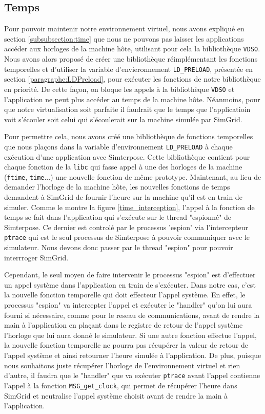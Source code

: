 \subsection{Temps}
\label{section:work:time}

Pour pouvoir maintenir notre environnement virtuel, nous avons expliqué en section \ref{subsubsection:time} que nous ne pouvons pas laisser les applications accéder aux horloges de la machine hôte, utilisant pour cela la bibliothèque \texttt{VDSO}. Nous avons alors proposé de créer une bibliothèque réimplémentant les fonctions temporelles et d'utiliser la variable d'envieronnement \texttt{LD\_PRELOAD}, présentée en section \ref{paragraphe:LDPreload}, pour exécuter les fonctions de notre bibliothèque en priorité. De cette façon, on bloque les appels à la bibliothèque \texttt{VDSO} et l'application ne peut plus accéder au temps de la machine hôte. Néanmoins, pour que notre virtualisation soit parfaite il faudrait que le temps que l'applicatioin voit s'écouler soit celui qui s'écoulerait sur la machine simulée par SimGrid. 

Pour permettre cela, nous avons créé une bibliothèque de fonctions temporelles que nous plaçons dans la variable d'environnement \texttt{LD\_PRELOAD} à chaque exécution d'une application avec Simterpose. Cette bibliothèque contient pour chaque fonction de la \texttt{libc} qui fasse appel à une des horloges de la machine (\texttt{ftime}, \texttt{time}...) une nouvelle fonction de même prototype. Maintenant, au lieu de demander l'horloge de la machine hôte, les nouvelles fonctions de temps demandent à SimGrid de fournir l'heure sur la machine qu'il est en train de simuler. Comme le montre la figure \ref{time_interception}, l'appel à la fonction de temps se fait dans l'application qui s'exécute sur le thread "espionné" de Simterpose. Ce dernier est controlé par le processus 'espion' via l'intercepteur \texttt{ptrace} qui est le seul processus de Simterpose à pouvoir communiquer avec le simulateur. Nous devons donc passer par le thread "espion" pour pouvoir interrroger SimGrid. 

Cependant, le seul moyen de faire intervenir le processus "espion" est d'effectuer un appel système dans l'application en train de s'exécuter. Dans notre cas, c'est la nouvelle fonction temporelle qui doit effecteur l'appel système. En effet, le processus "espion" va intercepter l'appel et exécuter le "handler" qu'on lui aura fourni si nécessaire, comme pour le reseau de communications, avant de rendre la main à l'application en plaçant dans le registre de retour de l'appel système l'horloge que lui aura donné le simulateur. Si une autre fonction effectue l'appel, la nouvelle fonction temporelle ne pourra pas récupérer la valeur de retour de l'appel système et ainsi retourner l'heure simulée à l'application. De plus, puisque nous souhaitons juste récupérer l'horloge de l'environnement virtuel et rien d'autre, il faudra que le "handler" que va exécuter \texttt{ptrace} avant l'appel contienne l'appel à la fonction \texttt{MSG\_get\_clock}, qui permet de récupérer l'heure dans SimGrid et neutralise l'appel système choisit avant de rendre la main à l'application. 

